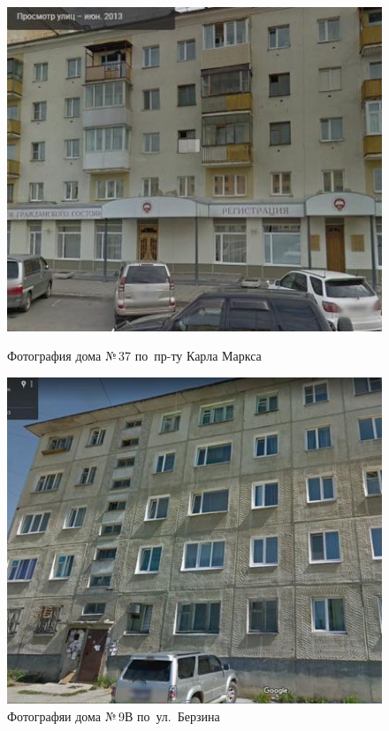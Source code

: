 \begin{figure}[H]
\begin{changemargin}{2cm}{2cm}
  \begin{center}
    \begin{minipage}[h]{0.45\linewidth}
        \includegraphics[width=1\textwidth]{authors/sydchak-fig-3.jpg}
        \caption{Фотография дома №\,37 по~пр-ту Карла Маркса}
        \label{fig:sydchak-fig-3}
    \end{minipage}
\hfill
    \begin{minipage}[h]{0.45\linewidth}
        \includegraphics[width=1\textwidth]{authors/sydchak-fig-4.jpg}
        \caption{Фотографяи дома №\,9В по~ул.~Берзина}
        \label{fig:sydchak-fig-4}
    \end{minipage}


  \end{center}
\end{changemargin}

\end{figure}
